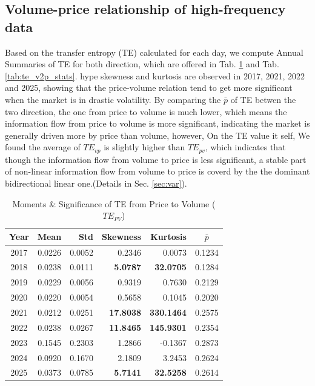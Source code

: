 \documentclass{elsarticle}
\def\rightarrow{}%
\begin{document}
\subsection{Volume-price relationship of high-frequency data}\label{sec:te_ori}
Based on the transfer entropy (TE) calculated for each day, we compute Annual Summaries of TE for both direction, which are offered in Tab. \ref{tab:te_p2v_stats} and Tab. \ref{tab:te_v2p_stats}. hype skewness and kurtosis are observed in 2017, 2021, 2022 and 2025, showing that the price-volume relation tend to get more significant when the market is in drastic volatility. By comparing the $\bar{p}$ of TE betwen the two direction, the one from price to volume is much lower, which means the information flow from price to volume is more significant, indicating the market is generally driven more by price than volume, however, On the TE value it self, We found the average of $TE_{v \rightarrow p}$ is slightly higher than $TE_{p \rightarrow v}$, which indicates that though the information flow from volume to price is less significant, a stable part of non-linear information flow from volume to price is coverd by the the dominant bidirectional linear one.(Details in Sec. \ref{sec:var}).
\begin{table}[H]
  \caption{Moments \& Significance of TE from Price to Volume ($TE_{P \rightarrow V}$)}
  \label{tab:te_p2v_stats}
  \centering
  \begin{tabular}{crrrrc}
    \hline\noalign{\smallskip}
    \textbf{Year} & \textbf{Mean} & \textbf{Std} & \textbf{Skewness} & \textbf{Kurtosis} & \textbf{$\bar{p}$} \\
    \hline\noalign{\smallskip}
    2017 & 0.0226 & 0.0052 & 0.2346 & 0.0073 & 0.1234 \\
    2018 & 0.0238 & 0.0111 & \textbf{5.0787} & \textbf{32.0705} & 0.1284 \\
    2019 & 0.0229 & 0.0056 & 0.9319 & 0.7630 & 0.2129 \\
    2020 & 0.0220 & 0.0054 & 0.5658 & 0.1045 & 0.2020 \\
    2021 & 0.0212 & 0.0251 & \textbf{17.8038} & \textbf{330.1464} & 0.2575 \\
    2022 & 0.0238 & 0.0267 & \textbf{11.8465} & \textbf{145.9301} & 0.2354 \\
    2023 & 0.1545 & 0.2303 & 1.2866 & -0.1367 & 0.2873 \\
    2024 & 0.0920 & 0.1670 & 2.1809 & 3.2453 & 0.2624 \\
    2025 & 0.0373 & 0.0785 & \textbf{5.7141} & \textbf{32.5258} & 0.2614 \\
    \hline
  \end{tabular}
\end{table}
\end{document}
